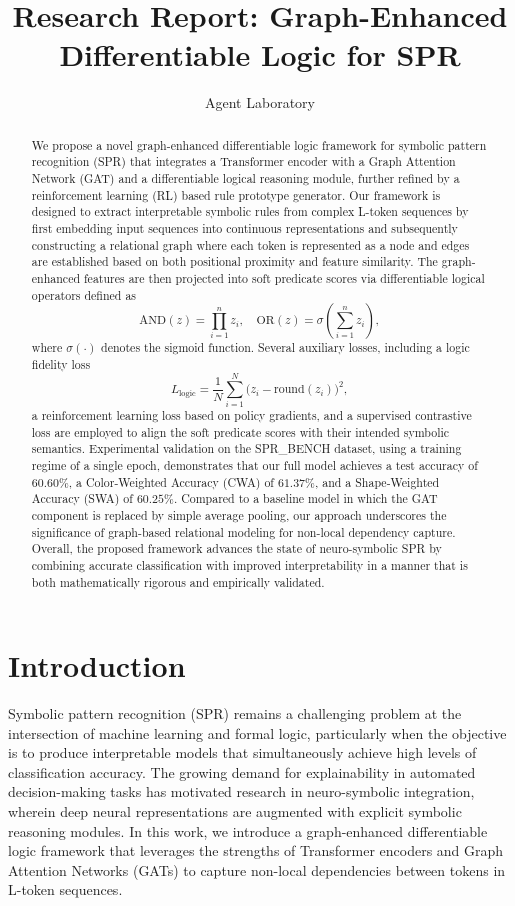 \documentclass{article}
\title{Research Report: Graph-Enhanced Differentiable Logic for SPR}
\author{Agent Laboratory}
\date{}
\begin{document}
\maketitle

\begin{abstract}
We propose a novel graph-enhanced differentiable logic framework for symbolic pattern recognition (SPR) that integrates a Transformer encoder with a Graph Attention Network (GAT) and a differentiable logical reasoning module, further refined by a reinforcement learning (RL) based rule prototype generator. Our framework is designed to extract interpretable symbolic rules from complex L-token sequences by first embedding input sequences into continuous representations and subsequently constructing a relational graph where each token is represented as a node and edges are established based on both positional proximity and feature similarity. The graph-enhanced features are then projected into soft predicate scores via differentiable logical operators defined as 
\[
\text{AND}(z)=\prod_{i=1}^{n}z_i,\quad \text{OR}(z)=\sigma\left(\sum_{i=1}^{n}z_i\right),
\]
where \(\sigma(\cdot)\) denotes the sigmoid function. Several auxiliary losses, including a logic fidelity loss 
\[
L_{\text{logic}}=\frac{1}{N}\sum_{i=1}^{N}\bigl(z_i-\text{round}(z_i)\bigr)^2,
\]
a reinforcement learning loss based on policy gradients, and a supervised contrastive loss are employed to align the soft predicate scores with their intended symbolic semantics. Experimental validation on the SPR\_BENCH dataset, using a training regime of a single epoch, demonstrates that our full model achieves a test accuracy of \(60.60\%\), a Color-Weighted Accuracy (CWA) of \(61.37\%\), and a Shape-Weighted Accuracy (SWA) of \(60.25\%\). Compared to a baseline model in which the GAT component is replaced by simple average pooling, our approach underscores the significance of graph-based relational modeling for non-local dependency capture. Overall, the proposed framework advances the state of neuro-symbolic SPR by combining accurate classification with improved interpretability in a manner that is both mathematically rigorous and empirically validated.
\end{abstract}

\section{Introduction}
Symbolic pattern recognition (SPR) remains a challenging problem at the intersection of machine learning and formal logic, particularly when the objective is to produce interpretable models that simultaneously achieve high levels of classification accuracy. The growing demand for explainability in automated decision-making tasks has motivated research in neuro-symbolic integration, wherein deep neural representations are augmented with explicit symbolic reasoning modules. In this work, we introduce a graph-enhanced differentiable logic framework that leverages the strengths of Transformer encoders and Graph Attention Networks (GATs) to capture non-local dependencies between tokens in L-token sequences. 
\end{document}
